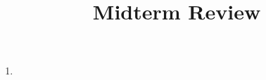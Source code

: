 \documentclass[10pt,a4paper,oneside]{book}
\title{Midterm Review}
\author{}
\date{}
\begin{document}
\maketitle

\begin{enumerate}
    \item  
    
 
\end{enumerate}
\end{document}
